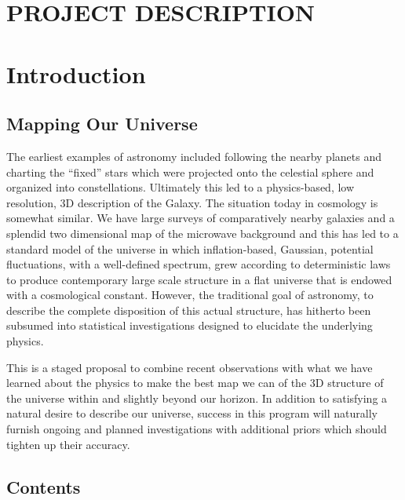 \documentclass[psfig,11pt]{article}
\begin{document}
\section*{PROJECT DESCRIPTION}


\section{Introduction}

\subsection{Mapping Our Universe}

The earliest examples of astronomy included following the nearby planets and charting the ``fixed'' stars which were projected onto the celestial sphere and organized into constellations. Ultimately this led to a physics-based, low resolution,  3D description of the Galaxy. The situation today in cosmology is somewhat similar. We have large surveys of comparatively nearby galaxies and a splendid two dimensional map of the microwave background and this has led to a standard model of the universe in which inflation-based, Gaussian, potential fluctuations, with a well-defined spectrum, grew according to deterministic laws to produce contemporary large scale structure in a flat universe that is endowed with a cosmological constant. However, the traditional goal of astronomy, to describe the complete disposition of this actual structure, has hitherto been subsumed into statistical investigations designed to elucidate the underlying physics.

This is a staged proposal to combine recent observations with what we have learned about the physics to make the best map we can of the 3D structure of the universe within and slightly beyond our horizon. In addition to satisfying a natural desire to describe our universe, success in this program will naturally furnish ongoing and planned investigations with additional priors which should tighten up their accuracy.

\subsection{Contents}
\end{document}
